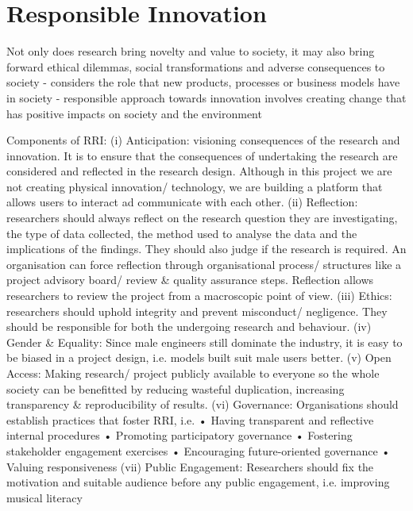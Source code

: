 \section{Responsible Innovation}
Not only does research bring novelty and value to society, it may also bring forward ethical dilemmas, social transformations and adverse consequences to society
-	considers the role that new products, processes or business models have in society 
-	responsible approach towards innovation involves creating change that has positive impacts on society and the environment

Components of RRI:
(i)	Anticipation: visioning consequences of the research and innovation. It is to ensure that the consequences of undertaking the research are considered and reflected in the research design. Although in this project we are not creating physical innovation/ technology, we are building a platform that allows users to interact ad communicate with each other.
(ii)	Reflection: researchers should always reflect on the research question they are investigating, the type of data collected, the method used to analyse the data and the implications of the findings. They should also judge if the research is required. An organisation can force reflection through organisational process/ structures like a project advisory board/ review & quality assurance steps. Reflection allows researchers to review the project from a macroscopic point of view.
(iii)	Ethics: researchers should uphold integrity and prevent misconduct/ negligence. They should be responsible for both the undergoing research and behaviour.
(iv)	Gender & Equality: Since male engineers still dominate the industry, it is easy to be biased in a project design, i.e. models built suit male users better.
(v)	Open Access: Making research/ project publicly available to everyone so the whole society can be benefitted by reducing wasteful duplication, increasing transparency & reproducibility of results.
(vi)	Governance: Organisations should establish practices that foster RRI, i.e. 
•	Having transparent and reflective internal procedures
•	Promoting participatory governance
•	Fostering stakeholder engagement exercises
•	Encouraging future-oriented governance
•	Valuing responsiveness
(vii)	Public Engagement: Researchers should fix the motivation and suitable audience before any public engagement, i.e. improving musical literacy

